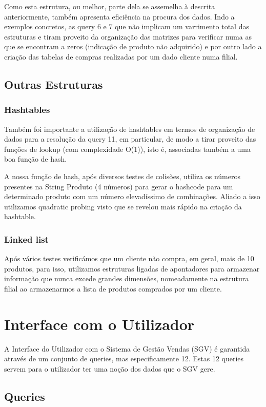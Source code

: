 \documentclass[a4paper,11pt]{report}
\begin{document}
Como esta estrutura, ou melhor, parte dela se assemelha à descrita anteriormente, também apresenta eficiência na procura dos dados. Indo a exemplos concretos, as query 6 e 7 que não implicam um varrimento total das estruturas e tiram proveito da organização das matrizes para verificar numa as que se encontram a zeros (indicação de produto não adquirido) e por outro lado a criação das tabelas de compras realizadas por um dado cliente numa filial.

\section{Outras Estruturas}

\subsection{Hashtables}
\quad Também foi importante a utilização de hashtables em termos de organização de dados para a resolução da query 11, em particular, de modo a tirar proveito das funções de lookup (com complexidade O(1)), isto é, associadas também a uma boa função de hash.

A nossa função de hash, após diversos testes de colisões, utiliza os números presentes na String Produto (4 números) para gerar o hashcode para um determinado produto com um número elevadíssimo de combinações. Aliado a isso utilizamos quadratic probing visto que se revelou mais rápido na criação da hashtable.

\subsection{Linked list}
\quad Após vários testes verificámos que um cliente não compra, em geral, mais de 10 produtos, para isso, utilizamos estruturas ligadas de apontadores para armazenar informação que nunca excede grandes dimensões, nomeadamente na estrutura filial ao armazenarmos a lista de produtos comprados por um cliente.



\chapter{Interface com o Utilizador}
\quad A Interface do Utilizador com o Sistema de Gestão Vendas (SGV) é garantida através de um conjunto de queries, mas especificamente 12. Estas 12 queries servem para o utilizador ter uma noção dos dados que o SGV gere.


\section{Queries}
\label{sec:Queries}
\end{document}
